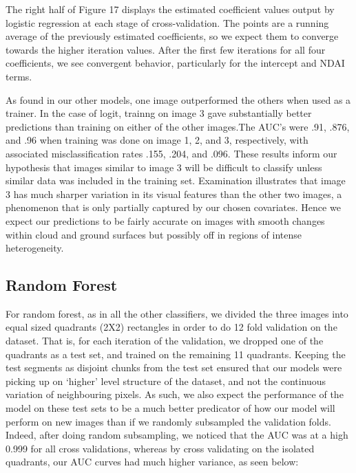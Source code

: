 \documentclass{article}\usepackage[]{graphicx}\usepackage[]{color}
\begin{document}
The right half of Figure 17 displays the estimated coefficient values output by logistic regression at each stage of cross-validation. The points are a running average of the previously estimated coefficients, so we expect them to converge towards the higher iteration values. After the first few iterations for all four coefficients, we see convergent behavior, particularly for the intercept and NDAI terms. 

As found in our other models, one image outperformed the others when used as a trainer. In the case of logit, trainng on image 3 gave substantially better predictions than training on either of the other images.The AUC's were .91, .876, and .96 when training was done on image 1, 2, and 3, respectively, with associated misclassification rates .155, .204, and .096. These results inform our hypothesis that images similar to image 3 will be difficult to classify unless similar data was included in the training set. Examination illustrates that image 3 has much sharper variation in its visual features than the other two images, a phenomenon that is only partially captured by our chosen covariates. Hence we expect our predictions to be fairly accurate on images with smooth changes within cloud and ground surfaces but possibly off in regions of intense heterogeneity.

\subsection{Random Forest}

For random forest, as in all the other classifiers, we divided the three images into equal sized quadrants (2X2) rectangles in order to do 12 fold validation on the dataset.  That is, for each iteration of the validation, we dropped one of the quadrants as a test set, and trained on the remaining 11 quadrants.  Keeping the test segments as disjoint chunks from the test set ensured that our models were picking up on `higher' level structure of the dataset, and not the continuous variation of neighbouring pixels.  As such, we also expect the performance of the model on these test sets to be a much better predicator of how our model will perform on new images than if we randomly subsampled the validation folds.  Indeed, after doing random subsampling, we noticed that the AUC was at a high 0.999 for all cross validations, whereas by cross validating on the isolated quadrants, our AUC curves had much higher variance, as seen below: \\
\end{document}
